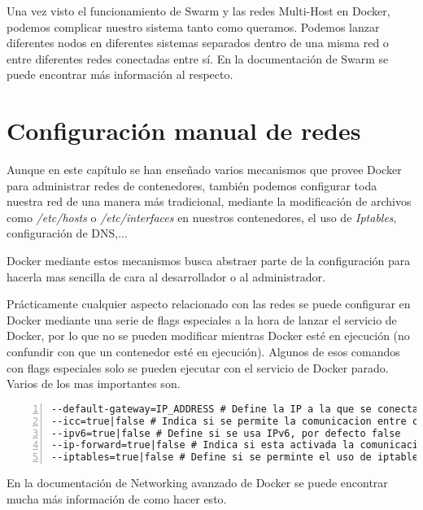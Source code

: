 			Una vez visto el funcionamiento de Swarm y las redes Multi-Host en Docker, podemos complicar nuestro sistema tanto como queramos. Podemos lanzar diferentes nodos en diferentes sistemas separados dentro de una misma red o entre diferentes redes conectadas entre sí. En la documentación de Swarm \cite{docker-swarm} se puede encontrar más información al respecto.	
	
	\section{Configuración manual de redes}
	Aunque en este capítulo se han enseñado varios mecanismos que provee Docker para administrar redes de contenedores, también podemos configurar toda nuestra red de una manera más tradicional, mediante la modificación de archivos como \emph{/etc/hosts} o \emph{/etc/interfaces} en nuestros contenedores, el uso de \emph{Iptables}, configuración de DNS,... 
	
	Docker mediante estos mecanismos busca abstraer parte de la configuración para hacerla mas sencilla de cara al desarrollador o al administrador.
	
	Prácticamente cualquier aspecto relacionado con las redes se puede configurar en Docker mediante una serie de flags especiales a la hora de lanzar el servicio de Docker, por lo que no se pueden modificar mientras Docker esté en ejecución (no confundir con que un contenedor esté en ejecución). Algunos de esos comandos con flags especiales solo se pueden ejecutar con el servicio de Docker parado. Varios de los mas importantes son.
	
	\begin{lstlisting}[style=consola,numbers=left]
--default-gateway=IP_ADDRESS # Define la IP a la que se conectaran los contenedores de Docker al crearse, por defecto se usa la de docker0
--icc=true|false # Indica si se permite la comunicacion entre contenedores, por defecto true
--ipv6=true|false # Define si se usa IPv6, por defecto false
--ip-forward=true|false # Indica si esta activada la comunicacion entre los contenedores y el exterior, por defecto true
--iptables=true|false # Define si se perminte el uso de iptables (filtra direcciones y puertos, se usa como firewall en sistemas tipo UNIX)
	\end{lstlisting}
	
	En la documentación de Networking avanzado de Docker \cite{docker-network-advanced} se puede encontrar mucha más información de como hacer esto.
	